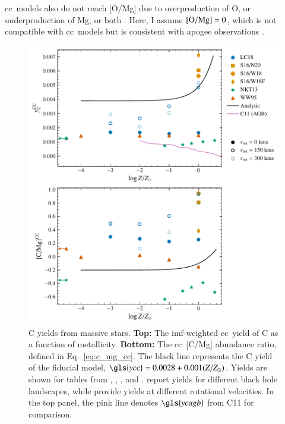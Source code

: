 \documentclass[12pt,oneside,letterpaper]{report}
\newcommand{\cc}{\gls{cc}}
\newcommand{\Cc}{\Gls{cc}}
\newcommand{\imf}{\gls{imf}}
\newcommand{\apogee}{\gls{apogee}}
\newcommand{\Ycc}{\gls{ycc}}
\newcommand{\Ycagb}{\gls{ycagb}}
\begin{document}
\Cc\ models also do not reach [O/Mg] due to overproduction of O, or underproduction of Mg, or both \citep{emily+21}. Here, I assume ${\rm [O/Mg]} = 0$, which is not compatible with \cc\ models but is consistent with \apogee{} observations \citep{weinberg+19, weinberg+22}.
    

\begin{figure}[htp]
    \centering
    \includegraphics{y_c_cc.pdf}
    \caption[Massive star C yields]{
        C yields from massive stars.
        \textbf{Top:} The \imf-weighted \cc\ yield of C as a function of metallicity.
        \textbf{Bottom:} The \cc\ [C/Mg] abundance ratio, defined in Eq.~\ref{eq:c_mg_cc}. The black line represents the C yield of the fiducial model,
    $\Ycc = 0.0028 + 0.001 (Z/Z_{\odot})$. Yields are shown for tables from 
    \citet[red triangles]{WW95}, \citet[orange squares and diamonds]{sukhbold+16}, 
    \citet[green stars]{NKT13}, and \citet[blue circles]{LC18}. \citet{sukhbold+16} report yields for different black hole landscapes, while \citet{LC18} provide yields at different rotational velocities.
In the top panel, the pink line denotes $\Ycagb$ from C11 for comparison.
}
    \label{fig:y_cc}
\end{figure}
\end{document}
